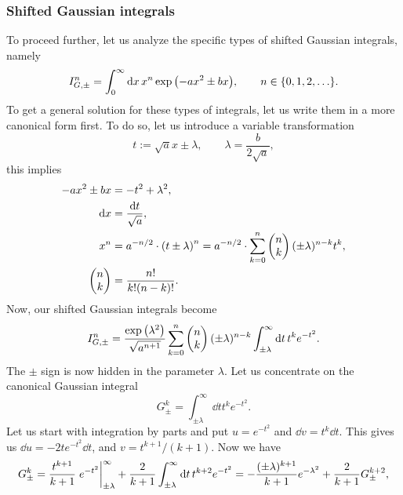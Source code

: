 \documentclass[aps,prl,preprint,groupedaddress,10pt]{revtex4-2}
\begin{document}
\subsubsection{Shifted Gaussian integrals}
To proceed further, let us analyze the specific types of shifted Gaussian integrals,
namely
\begin{equation}
    I_{G,\pm}^n=\int_{0}^{\infty}\dd{x}x^n\exp\pqty{-ax^2\pm bx},
    \qquad n\in\Bqty{0,1,2,\dots}.
\end{equation}
To get a general solution for these types of integrals, let us write them in a
more canonical form first. To do so, let us introduce a variable transformation
\begin{equation}
    t:=\sqrt{a}x\pm\lambda,\qquad\lambda=\frac{b}{2\sqrt{a}},
\end{equation}
this implies
\begin{equation}
    \begin{split}
        -ax^2\pm bx&=-t^2+\lambda^2,\\
        \dd{x}&=\frac{\dd{t}}{\sqrt{a}},\\
        x^n&=a^{-n/2}\cdot\pqty{t\pm\lambda}^n=a^{-n/2}\cdot
        \sum_{k=0}^{n}\pmqty{n\\k}(\pm\lambda)^{n-k}t^k,\\
        \pmqty{n\\k}&=\frac{n!}{k!(n-k)!}.
    \end{split}
\end{equation}
Now, our shifted Gaussian integrals become
\begin{equation}
    I_{G,\pm}^{n}=\frac{\exp\pqty{\lambda^2}}{\sqrt{a^{n+1}}}\sum_{k=0}^{n}\pmqty{n\\k}
    (\pm\lambda)^{n-k}\int_{\pm\lambda}^{\infty}\dd{t}t^ke^{-t^2}.
\end{equation}
The $\pm$ sign is now hidden in the parameter $\lambda$. Let us concentrate on the
canonical Gaussian integral
\begin{equation}
    G^k_{\pm}=\int_{\pm\lambda}^{\infty}\dd{t}t^ke^{-t^2}.
\end{equation}
Let us start with integration by parts and put $u=e^{-t^2}$ and $\dd{v}=t^k\dd{t}$.
This gives us $\dd{u}=-2te^{-t^2}\dd{t}$, and $v=t^{k+1}/(k+1)$. Now we have
\begin{equation}
    G^k_{\pm}=\frac{t^{k+1}}{k+1}\eval{e^{-t^2}}_{\pm\lambda}^{\infty}+
    \frac{2}{k+1}\int_{\pm\lambda}^{\infty}\dd{t}t^{k+2}e^{-t^2}=
    -\frac{(\pm\lambda)^{k+1}}{k+1}e^{-\lambda^2}+\frac{2}{k+1}G^{k+2}_{\pm},
\end{equation}
\end{document}
